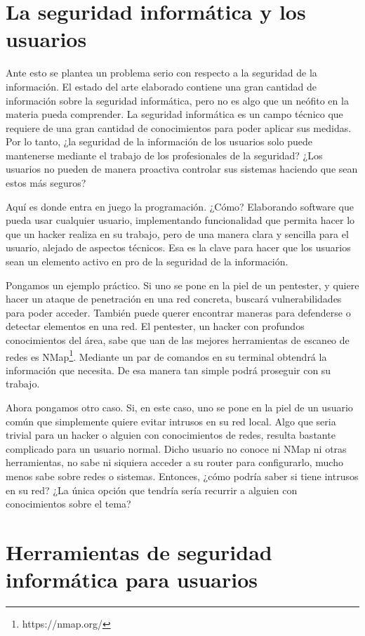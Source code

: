 \section{La seguridad informática y los usuarios}

Ante esto se plantea un problema serio con respecto a la seguridad de la información. El estado del arte elaborado contiene una gran cantidad de información sobre la seguridad informática, pero no es algo que un neófito en la materia pueda comprender. La seguridad informática es un campo técnico que requiere de una gran cantidad de conocimientos para poder aplicar sus medidas. Por lo tanto, ¿la seguridad de la información de los usuarios solo puede mantenerse mediante el trabajo de los profesionales de la seguridad? ¿Los usuarios no pueden de manera proactiva controlar sus sistemas haciendo que sean estos más seguros?

Aquí es donde entra en juego la programación. ¿Cómo? Elaborando software que pueda usar cualquier usuario, implementando funcionalidad que permita hacer lo que un hacker realiza en su trabajo, pero de una manera clara y sencilla para el usuario, alejado de aspectos técnicos. Esa es la clave para hacer que los usuarios sean un elemento activo en pro de la seguridad de la información.

Pongamos un ejemplo práctico. Si uno se pone en la piel de un pentester, y quiere hacer un ataque de penetración en una red concreta, buscará vulnerabilidades para poder acceder. También puede querer encontrar maneras para defenderse o detectar elementos en una red. El pentester, un hacker con profundos conocimientos del área, sabe que uan de las mejores herramientas de escaneo de redes es NMap\footnote{https://nmap.org/}. Mediante un par de comandos en su terminal obtendrá la información que necesita. De esa manera tan simple podrá proseguir con su trabajo.

Ahora pongamos otro caso. Si, en este caso, uno se pone en la piel de un usuario común que simplemente quiere evitar intrusos en su red local. Algo que seria trivial para un hacker o alguien con conocimientos de redes, resulta bastante complicado para un usuario normal. Dicho usuario no conoce ni NMap ni otras herramientas, no sabe ni siquiera acceder a su router para configurarlo, mucho menos sabe sobre redes o sistemas. Entonces, ¿cómo podría saber si tiene intrusos en su red? ¿La única opción que tendría sería recurrir a alguien con conocimientos sobre el tema?

\section{Herramientas de seguridad informática para usuarios}


